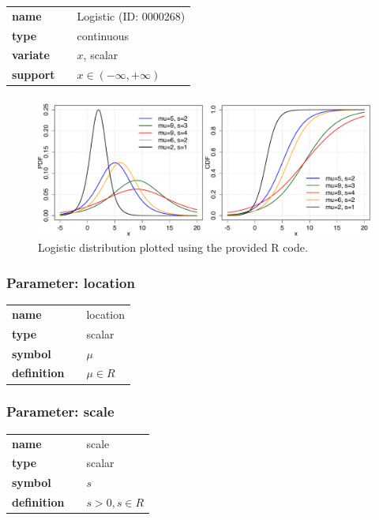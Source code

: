   \bigskip 

\begin{tabular}{p{2cm}cl}
\textbf{name} & & Logistic (ID: 0000268)\\ 
 
\textbf{type} & & continuous \\ 

\textbf{variate} & & $x$, scalar \\ 

\textbf{support} & & $x \in (-\infty,+\infty)$
\end{tabular}

\begin{figure}[ht!]
\centering
  \includegraphics[width=140mm]{pics/Logistic.pdf}
 \caption{Logistic distribution plotted using the provided R code.}
 \label{fig:Logistic}
\end{figure}

\subsubsection*{Parameter: location}

\noindent\begin{tabular}{p{2cm}cl}
\textbf{name} & & location \\
\textbf{type} & & scalar \\
\textbf{symbol} & & $\mu$  \\
\textbf{definition} & & $\mu \in R$
\end{tabular}
\subsubsection*{Parameter: scale}

\noindent\begin{tabular}{p{2cm}cl}
\textbf{name} & & scale \\
\textbf{type} & & scalar \\
\textbf{symbol} & & $s$  \\
\textbf{definition} & & $s > 0, s \in R$
\end{tabular}
